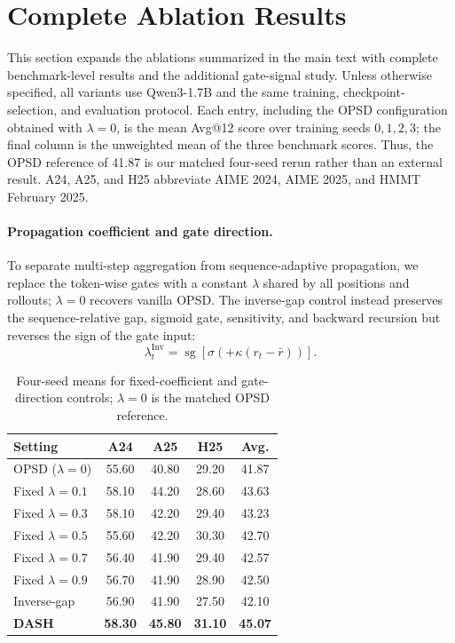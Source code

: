 \documentclass[letterpaper]{article} %
\begin{document}
\section{Complete Ablation Results}
\label{sec:complete_ablations}

This section expands the ablations summarized in the main text with
complete benchmark-level results and the additional gate-signal study.
Unless otherwise specified, all variants use Qwen3-1.7B and the same
training, checkpoint-selection, and evaluation protocol. Each entry,
including the OPSD configuration obtained with $\lambda=0$, is the mean
Avg@12 score over training seeds \(0,1,2,3\); the final column is the
unweighted mean of the three benchmark scores. Thus, the OPSD reference
of 41.87 is our matched four-seed rerun rather than an external result.
A24, A25, and H25 abbreviate AIME 2024, AIME 2025, and HMMT February
2025.

\paragraph{Propagation coefficient and gate direction.}
To separate multi-step aggregation from sequence-adaptive propagation,
we replace the token-wise gates with a constant \(\lambda\) shared by
all positions and rollouts; \(\lambda=0\) recovers vanilla OPSD. The
inverse-gap control instead preserves the sequence-relative gap,
sigmoid gate, sensitivity, and backward recursion but reverses the sign
of the gate input:
\begin{equation}
    \lambda_t^{\mathrm{Inv}}
    =
    \operatorname{sg}\!\left[
        \sigma\!\left(+\kappa(r_t-\bar r)\right)
    \right].
\end{equation}

\begin{table}[!htbp]
\centering
\footnotesize
\setlength{\tabcolsep}{2.8pt}
\begin{tabular}{@{}lcccc@{}}
\toprule
\textbf{Setting} & \textbf{A24} & \textbf{A25} & \textbf{H25} & \textbf{Avg.} \\
\midrule
OPSD ($\lambda=0$) & 55.60 & 40.80 & 29.20 & 41.87 \\
Fixed $\lambda=0.1$ & 58.10 & 44.20 & 28.60 & 43.63 \\
Fixed $\lambda=0.3$ & 58.10 & 42.20 & 29.40 & 43.23 \\
Fixed $\lambda=0.5$ & 55.60 & 42.20 & 30.30 & 42.70 \\
Fixed $\lambda=0.7$ & 56.40 & 41.90 & 29.40 & 42.57 \\
Fixed $\lambda=0.9$ & 56.70 & 41.90 & 28.90 & 42.50 \\
Inverse-gap & 56.90 & 41.90 & 27.50 & 42.10 \\
\textbf{DASH} & \textbf{58.30} & \textbf{45.80} & \textbf{31.10} & \textbf{45.07} \\
\bottomrule
\end{tabular}
\caption{Four-seed means for fixed-coefficient and gate-direction
controls; $\lambda=0$ is the matched OPSD reference.}
\label{tab:supp_propagation_controls}
\label{tab:supp_fixed_lambda}
\label{tab:supp_gate_direction}
\end{table}
\end{document}
